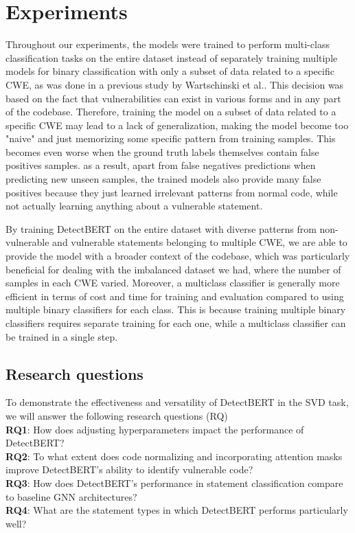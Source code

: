 \documentclass{ieeeaccess}
\begin{document}
\section{Experiments} \label{sec:experiments}
\par Throughout our experiments,  the models were trained to perform multi-class classification tasks on the entire dataset instead of separately training multiple models for binary classification with only a subset of data related to a specific CWE, as was done in a previous study by Wartschinski et al.\cite{VUDENC}. This decision was based on the fact that vulnerabilities can exist in various forms and in any part of the codebase. Therefore, training the model on a subset of data related to a specific CWE may lead to a lack of generalization,  making the model  become too "naive" and just memorizing some specific pattern from training samples. This becomes even worse when the ground truth labels themselves contain false positives samples. as a result,  apart from false negatives predictions when predicting new unseen samples, the trained models also provide many false positives because they just learned irrelevant patterns from normal code, while not actually learning anything about a vulnerable statement.  

\par By training DetectBERT on the entire dataset with diverse patterns from non-vulnerable and vulnerable statements belonging to multiple CWE, we are able to provide the model with a broader context of the codebase, which was particularly beneficial for dealing with the imbalanced dataset we had, where the number of samples in each CWE varied. Moreover, a multiclass classifier is generally more efficient in terms of cost and time for training and evaluation compared to using multiple binary classifiers for each class. This is because training multiple binary classifiers requires separate training for each one, while a multiclass classifier can be trained in a single step.


\subsection{Research questions} \label{sec:RQ}
To demonstrate the effectiveness and versatility of DetectBERT in the SVD task,  we will answer the following research questions (RQ)\\
 \textbf{RQ1}: How does adjusting hyperparameters impact the performance of DetectBERT?\\
 \textbf{RQ2}: To what extent does code normalizing and incorporating attention masks improve DetectBERT's ability to identify vulnerable code?\\
 \textbf{RQ3}: How does DetectBERT's performance in statement classification compare to baseline GNN architectures?\\
 \textbf{RQ4}: What are the statement types in which DetectBERT performs particularly well?\\
\end{document}
